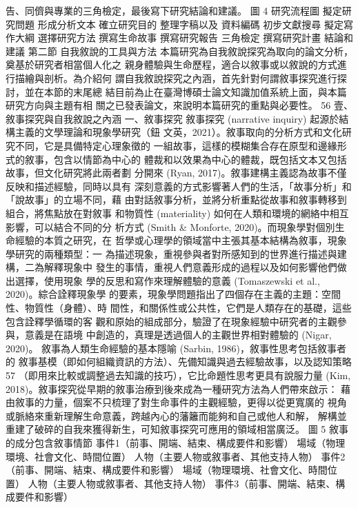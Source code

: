 告、同儕與專業的三角檢定，最後寫下研究結論和建議。 
圖 4  
研究流程圖 
擬定研究問題
形成分析文本
確立研究目的
整理字稿以及
資料編碼
初步文獻搜尋
擬定寫作大綱
選擇研究方法
撰寫生命故事
撰寫研究報告
三角檢定
撰寫研究計畫
結論和建議
第二節 自我敘說的工具與方法 
本篇研究為自我敘說探究為取向的論文分析，奠基於研究者相當個人化之
親身體驗與生命歷程，適合以敘事或以敘說的方式進行描繪與剖析。為介紹何
謂自我敘說探究之內涵，首先針對何謂敘事探究進行探討，並在本節的末尾總
結目前為止在臺灣博碩士論文知識加值系統上面，與本篇研究方向與主題有相
關之已發表論文，來說明本篇研究的重點與必要性。 
56 
壹、敘事探究與自我敘說之內涵 
一、敘事探究 
敘事探究 (narrative inquiry) 起源於結構主義的文學理論和現象學研究（鈕
文英，2021）。敘事取向的分析方式和文化研究不同，它是具備特定心理象徵的
一組故事，這樣的模糊集合存在原型和邊緣形式的敘事，包含以情節為中心的
體裁和以效果為中心的體裁，既包括文本又包括故事，但文化研究將此兩者劃
分開來 (Ryan, 2017)。敘事建構主義認為故事不僅反映和描述經驗，同時以具有
深刻意義的方式影響著人們的生活，「故事分析」和「說故事」的立場不同，藉
由對話敘事分析，並將分析重點從故事和敘事轉移到組合，將焦點放在對敘事
和物質性 (materiality) 如何在人類和環境的網絡中相互影響，可以結合不同的分
析方式 (Smith & Monforte, 2020)。而現象學對個別生命經驗的本質之研究，在
哲學或心理學的領域當中主張其基本結構為敘事，現象學研究的兩種類型：一
為描述現象，重視參與者對所感知到的世界進行描述與建構，二為解釋現象中
發生的事情，重視人們意義形成的過程以及如何影響他們做出選擇，使用現象
學的反思和寫作來理解體驗的意義 (Tomaszewski et al., 2020)。綜合詮釋現象學
的要素，現象學問題指出了四個存在主義的主題：空間性、物質性（身體）、時
間性，和關係性或公共性，它們是人類存在的基礎，這些包含詮釋學循環的客
觀和原始的組成部分，驗證了在現象經驗中研究者的主觀參與，意義是在語境
中創造的，真理是透過個人的主觀世界相對體驗的 (Nigar, 2020)。 
敘事為人類生命經驗的基本隱喻 (Sarbin, 1986)，敘事性思考包括敘事者的
敘事基模（即如何組織資訊的方法）、先備知識與過去經驗故事，以及認知策略
57 
（即用來比較或調整過去知識的技巧），它比命題性思考更具有說服力量 (Kim, 
2018)。敘事探究從早期的敘事治療到後來成為一種研究方法為人們帶來啟示：
藉由敘事的力量，個案不只梳理了對生命事件的主觀經驗，更得以從更寬廣的
視角或脈絡來重新理解生命意義，跨越內心的藩籬而能夠和自己或他人和解，
解構並重建了破碎的自我來獲得新生，可知敘事探究可應用的領域相當廣泛。 
圖 5  
敘事的成分包含敘事情節 
事件1（前事、開端、結束、構成要件和影響）
場域（物理環境、社會文化、時間位置）
人物（主要人物或敘事者、其他支持人物）
事件2（前事、開端、結束、構成要件和影響）
場域（物理環境、社會文化、時間位置）
人物（主要人物或敘事者、其他支持人物）
事件3（前事、開端、結束、構成要件和影響）
